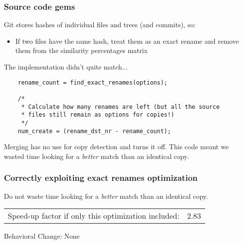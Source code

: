 \documentclass[compress,t]{beamer}
\begin{document}

\begin{frame}[fragile]
  \frametitle{Source code gems}

  Git stores hashes of individual files and trees (and commits), so:
  \pause
  \begin{itemize}
    \item If two files have the same hash, treat them as an exact rename and
          remove them from the similarity percentages matrix
  \end{itemize}

  \pause
  \vspace*{1.0\baselineskip}
  The implementation didn't quite match...\\
  \vspace*{0.5\baselineskip}
  \qquad
  \begin{minipage}{0.8\textwidth}
  {\footnotesize
  \begin{verbatim}
	rename_count = find_exact_renames(options);

	/*
	 * Calculate how many renames are left (but all the source
	 * files still remain as options for copies!)
	 */
	num_create = (rename_dst_nr - rename_count);
  \end{verbatim}
  }
  \end{minipage}

  \pause
  \vspace*{1.0\baselineskip}
  Merging has no use for copy detection and turns it off.
  \pause
  This code meant we wasted time looking for a \textit{better} match than
  an identical copy.

\end{frame}


\begin{frame}
  \frametitle{Correctly exploiting exact renames optimization}

  Do not waste time looking for a \textit{better} match than an
  identical copy.

  \pause
  \vspace*{\baselineskip}
  \begin{tabular}{lr}
    Speed-up factor if only this optimization included:  & 2.83 \\
  \end{tabular}

  \vspace*{2\baselineskip}
  \pause
  {\scriptsize
  Behavioral Change: None
  }

\end{frame}
\end{document}
